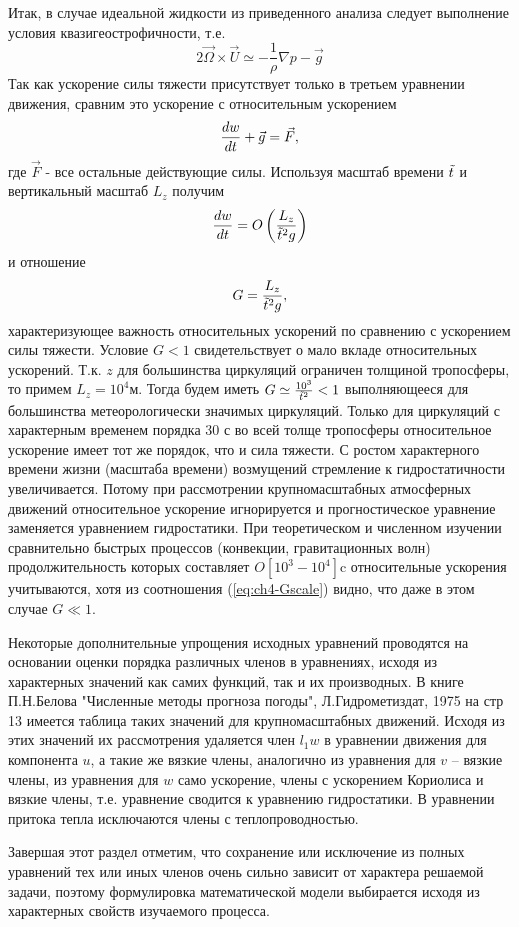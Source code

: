 Итак, в случае идеальной жидкости из приведенного анализа следует выполнение условия квазигеострофичности, т.е.
\[
2\vec{\Omega}\times\vec{U}\simeq -\frac{1}{\rho}\nabla p - \vec{g}
\]
Так как ускорение силы тяжести присутствует только в третьем уравнении движения, сравним это ускорение с относительным ускорением
\[
\displaystyle\frac{d w}{d t}+\vec{g}=\vec{F},
\]
где $\vec{F}$ - все остальные действующие силы. Используя масштаб времени $\Tilde{t}$ и вертикальный масштаб $L_z$ получим
\[
\displaystyle\frac{d w}{d t}=O\left(\frac{L_z}{\Tilde{t}^2g}\right)
\]
и отношение
\begin{equation}
    \label{eq:ch4-Gscale}
    G=\frac{L_z}{\Tilde{t}^2g},
\end{equation}
характеризующее важность относительных ускорений по сравнению с ускорением силы тяжести. Условие $G<1$ свидетельствует о мало вкладе относительных ускорений. Т.к. $z$ для большинства циркуляций ограничен толщиной тропосферы, то примем $L_z=10^4$м. Тогда будем иметь $G \simeq \frac{10^3}{\Tilde{t}^2}<1$ выполняющееся для большинства метеорологически значимых циркуляций. Только для циркуляций с характерным временем порядка 30 с во всей толще тропосферы относительное ускорение имеет тот же порядок, что и сила тяжести. С ростом характерного времени жизни (масштаба времени) возмущений стремление к гидростатичности увеличивается. Потому при рассмотрении крупномасштабных атмосферных движений относительное ускорение игнорируется и прогностическое уравнение заменяется уравнением гидростатики. При теоретическом и численном изучении сравнительно быстрых процессов (конвекции, гравитационных волн) продолжительность которых составляет $O[10^3-10^4]$c относительные ускорения учитываются, хотя из соотношения (\ref{eq:ch4-Gscale}) видно, что даже в этом случае $G\ll1$.

Некоторые дополнительные упрощения исходных уравнений проводятся на основании оценки порядка различных членов в уравнениях, исходя из характерных значений как самих функций, так и их производных. В книге П.Н.Белова "Численные методы прогноза погоды", Л.Гидрометиздат, 1975 на стр 13 имеется таблица таких значений для крупномасштабных движений. Исходя из этих значений их рассмотрения удаляется член $l_1w$ в уравнении движения для компонента $u$, а такие же вязкие члены, аналогично из уравнения для $v$ -- вязкие члены, из уравнения для $w$ само ускорение, члены с ускорением Кориолиса и вязкие члены, т.е. уравнение сводится к уравнению гидростатики. В уравнении притока тепла исключаются члены с теплопроводностью. 

Завершая этот раздел отметим, что сохранение или исключение из полных уравнений тех или иных членов очень сильно зависит от характера решаемой задачи, поэтому формулировка математической модели выбирается исходя из характерных свойств изучаемого процесса. 

